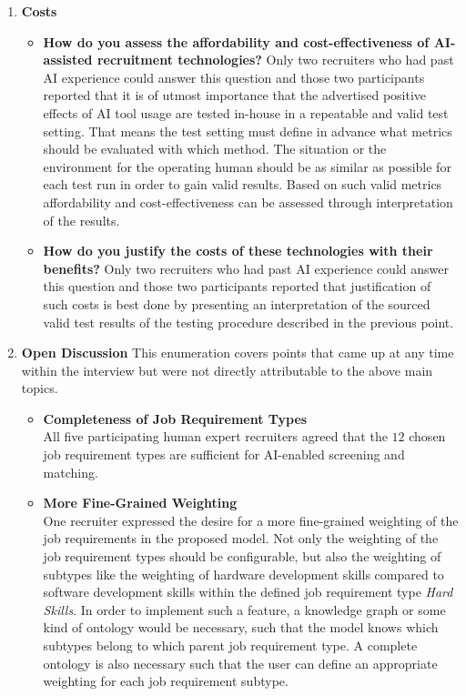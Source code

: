 \documentclass[draft,final]{thesisclass} %
\begin{document}
\begin{enumerate}
\begin{itemize}
    \end{itemize}
    \item \textbf{Costs}
    \begin{itemize}
        \item \textbf{How do you assess the affordability and cost-effectiveness of \acs{AI}-assisted recruitment technologies?}
        Only two recruiters who had past \acs{AI} experience could answer this question and those two participants reported that it is of utmost importance that the advertised positive effects of \acs{AI} tool usage are tested in-house in a repeatable and valid test setting. That means the test setting must define in advance what metrics should be evaluated with which method. The situation or the environment for the operating human should be as similar as possible for each test run in order to gain valid results. Based on such valid metrics affordability and cost-effectiveness can be assessed through interpretation of the results. 
        \item \textbf{How do you justify the costs of these technologies with their benefits?}
        Only two recruiters who had past \acs{AI} experience could answer this question and those two participants reported that justification of such costs is best done by presenting an interpretation of the sourced valid test results of the testing procedure described in the previous point.
    \end{itemize}
    \item \textbf{Open Discussion}
    This enumeration covers points that came up at any time within the interview but were not directly attributable to the above main topics.
    \begin{itemize}
        \item \textbf{Completeness of Job Requirement Types}\\
        All five participating human expert recruiters agreed that the $12$ chosen job requirement types are sufficient for \acs{AI}-enabled screening and matching.
        \item \textbf{More Fine-Grained Weighting}\\
        One recruiter expressed the desire for a more fine-grained weighting of the job requirements in the proposed model. 
        Not only the weighting of the job requirement types should be configurable, but also the weighting of subtypes like the weighting of hardware development skills compared to software development skills within the defined job requirement type \textit{Hard Skills}.
        In order to implement such a feature, a knowledge graph or some kind of ontology would be necessary, such that the model knows which subtypes belong to which parent job requirement type. A complete ontology is also necessary such that the user can define an appropriate weighting for each job requirement subtype.

\end{itemize}
\end{enumerate}
\end{document}
